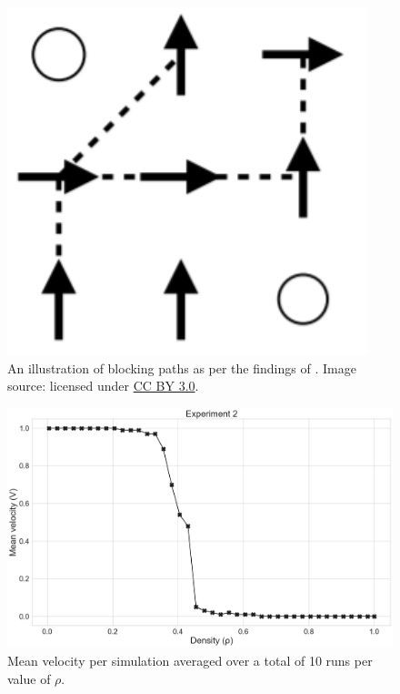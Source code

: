 \begin{figure}[H]
    \centering
    \includegraphics[width=0.475\linewidth]{Images/Section 4/Blocking-Paths-1.pdf}
    \caption{An illustration of blocking paths as per the findings of \citeauthor{Omer}.  Image source: \cite{Omer} licensed under \href{https://creativecommons.org/licenses/by/3.0/}{CC BY 3.0}.}
    \label{fig:Blocking-Paths-1}
\end{figure}

\begin{figure}[H]
    \centering
    \includegraphics[width=\linewidth]{Images/Section 4/Experiment 2/2.1.pdf}
    \caption{Mean velocity per simulation averaged over a total of 10 runs per value of $\rho$.}
    \label{fig:Experiment-2.1}
\end{figure}

\vspace{3em}

